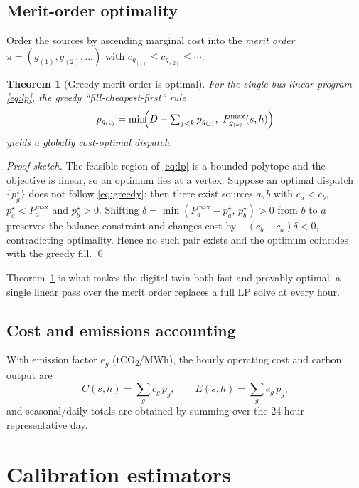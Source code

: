 \documentclass[11pt]{article}
\newtheorem{theorem}{Theorem}
\newcommand{\Pmax}{P^{\mathrm{max}}}
\begin{document}
\subsection{Merit-order optimality}
Order the sources by ascending marginal cost into the \emph{merit order}
$\pi=(g_{(1)},g_{(2)},\dots)$ with $c_{g_{(1)}}\le c_{g_{(2)}}\le\cdots$.

\begin{theorem}[Greedy merit order is optimal]
\label{thm:merit}
For the single-bus linear program \eqref{eq:lp}, the greedy ``fill-cheapest-first''
rule
\begin{equation}
p_{g_{(k)}}=\min\!\Bigl(D-\textstyle\sum_{j<k}p_{g_{(j)}},\ \Pmax_{g_{(k)}}(s,h)\Bigr)
\label{eq:greedy}
\end{equation}
yields a globally cost-optimal dispatch.
\end{theorem}
\begin{proof}[Proof sketch]
The feasible region of \eqref{eq:lp} is a bounded polytope and the objective is
linear, so an optimum lies at a vertex. Suppose an optimal dispatch
$\{p_g^\star\}$ does not follow \eqref{eq:greedy}: then there exist sources
$a,b$ with $c_a<c_b$, $p_a^\star<\Pmax_a$ and $p_b^\star>0$. Shifting
$\delta=\min(\Pmax_a-p_a^\star,\,p_b^\star)>0$ from $b$ to $a$ preserves the
balance constraint and changes cost by $-(c_b-c_a)\delta<0$, contradicting
optimality. Hence no such pair exists and the optimum coincides with the greedy
fill. \qed
\end{proof}
Theorem~\ref{thm:merit} is what makes the digital twin both fast and provably
optimal: a single linear pass over the merit order replaces a full LP solve at
every hour.

\subsection{Cost and emissions accounting}
With emission factor $e_g$ (\si{tCO_2/MWh}), the hourly operating cost and
carbon output are
\begin{equation}
C(s,h)=\sum_{g}c_g\,p_g,
\qquad
E(s,h)=\sum_{g}e_g\,p_g,
\end{equation}
and seasonal/daily totals are obtained by summing over the 24-hour
representative day.

\section{Calibration estimators}
\end{document}
